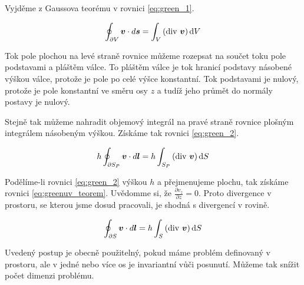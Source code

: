 Vyjděme z Gaussova teorému v rovnici \eqref{eq:green_1}.

\begin{equation}
\label{eq:green_1}
\oint_{\partial V} \vect{v} \cdot d\vect{s} = \int_V \left(\diverg \ \vect{v} \right) \mathrm{d}V
\end{equation}

Tok pole plochou na levé straně rovnice můžeme rozepsat na součet toku pole podstavami a pláštěm válce.
To pláštěm válce je tok hranicí podstavy násobené výškou válce, protože je pole po celé výšce konstantní. Tok podstavami je nulový, protože je pole konstantní ve směru osy \(z\) a tudíž jeho průmět do normály postavy je nulový.

Stejně tak můžeme nahradit objemový integrál na pravé straně rovnice plošným integrálem násobeným výškou. Získáme tak rovnici \eqref{eq:green_2}.

\begin{equation}
\label{eq:green_2}
h \oint_{\partial S_P} \boldsymbol{v} \cdot d\boldsymbol{l} = h \int_{S_P} \left(\mathrm{div} \ \boldsymbol{v} \right) \mathrm{d}S
\end{equation}

Podělíme-li rovnici \eqref{eq:green_2} výškou \(h\) a přejmenujeme plochu, tak získáme rovnici \eqref{eq:greenuv_teorem}. Uvědomme si, že \(\frac{\partial v_z}{\partial z} = 0\).
Proto divergence v prostoru, se kterou jsme dosud pracovali, je shodná s divergencí v rovině.

\begin{equation}
\label{eq:greenuv_teorem}
\oint_{\partial S} \vect{v} \cdot d\vect{l} = h \int_S \left(\diverg \ \vect{v} \right) \mathrm{d}S
\end{equation}

Uvedený postup je obecně použitelný, pokud máme problém definovaný v prostoru, ale v jedné nebo více os je invariantní vůči posunutí. Můžeme tak snížit
počet dimenzi problému.
